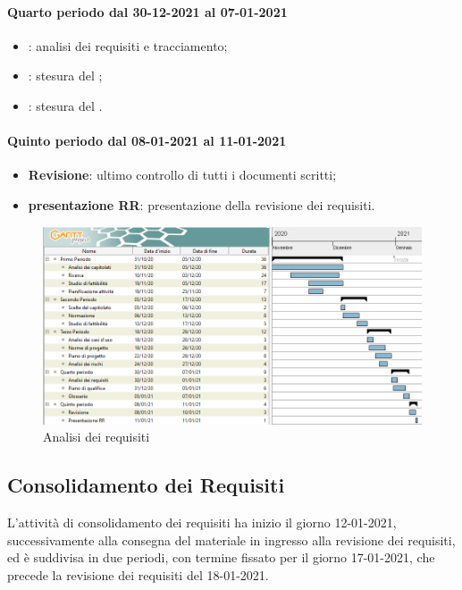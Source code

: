 	\paragraph{Quarto periodo dal 30-12-2021 al 07-01-2021}
	\begin{itemize}
	\item \textbf{}: analisi dei requisiti e tracciamento;
	\item \textbf{}: stesura del ;
	\item \textbf{}: stesura del .
	\end{itemize}
	
	\paragraph{Quinto periodo dal 08-01-2021 al 11-01-2021}
	\begin{itemize}
	\item \textbf{Revisione}: ultimo controllo di tutti i documenti scritti;
	\item \textbf{presentazione RR}: presentazione della revisione dei requisiti.
	\end{itemize}
	
	
	\newpage
	
	\begin{landscape}
	\begin{figure}[h!]
	\includegraphics[width=24cm]{images/1_Analisi_dei_requisiti.png}
	\caption{Analisi dei requisiti}
	\end{figure}
	\end{landscape}
	
	\newpage
	
	\subsection{Consolidamento dei Requisiti}
	L'attività di consolidamento dei requisiti ha inizio il giorno 12-01-2021, successivamente alla consegna
	del materiale in ingresso alla revisione dei requisiti, ed è suddivisa in due periodi, con termine fissato
	per il giorno 17-01-2021, che precede la revisione dei requisiti del 18-01-2021.
	
